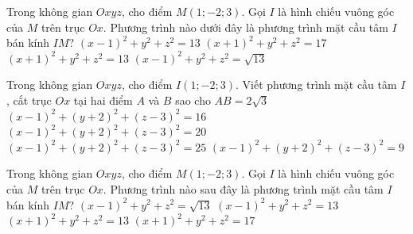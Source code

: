 \begin{ex}%
Trong không gian $Oxyz$, cho điểm $M(1;-2;3)$. Gọi $I$ là hình chiếu vuông góc của $M$ trên trục $Ox$. Phương trình nào dưới đây là phương trình mặt cầu tâm $I$ bán kính $IM$?
\choice
{\True $(x-1)^2+y^2+z^2=13$}
{$(x+1)^2+y^2+z^2=17$}
{$(x+1)^2+y^2+z^2=13$}
{$(x-1)^2+y^2+z^2=\sqrt{13}$}
\end{ex}

\begin{ex}%
Trong không gian $Oxyz$, cho điểm $I(1;-2;3)$. Viết phương trình mặt cầu tâm $I$, cắt trục $Ox$ tại hai điểm $A$ và $B$ sao cho $AB=2\sqrt{3}$
\choice
{\True $(x-1)^2+(y+2)^2+(z-3)^2=16$}
{$(x-1)^2+(y+2)^2+(z-3)^2=20$}
{$(x-1)^2+(y+2)^2+(z-3)^2=25$}
{$(x-1)^2+(y+2)^2+(z-3)^2=9$}
\end{ex}

\begin{ex}%
Trong không gian $Oxyz$, cho điểm $M(1;-2;3)$. Gọi $I$ là hình chiếu vuông góc của $M$ trên trục $Ox$. Phương trình nào sau đây là phương trình mặt cầu tâm $I$ bán kính $IM$?
\choice
{$(x-1)^2+y^2+z^2=\sqrt{13}$}
{\True $(x-1)^2+y^2+z^2=13$}
{$(x+1)^2+y^2+z^2=13$}
{$(x+1)^2+y^2+z^2=17$}
\end{ex}

